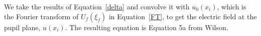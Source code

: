 
    







We take the results of Equation~\ref{delta} and convolve it with $u_0(x_i)$, which is the Fourier transform of $U_f(\xi_f)$ in Equation~\ref{FT}, to get the electric field at the pupil plane, $u(x_i)$. The resulting equation is Equation 5a from Wilson.\citep{wilson1975wavefront}




